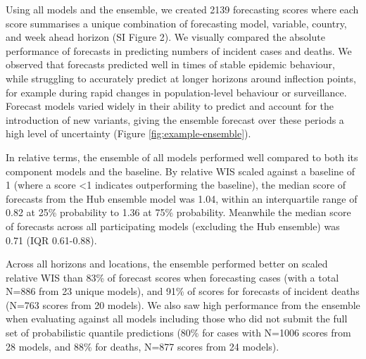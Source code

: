 \documentclass[
]{article}
\begin{document}
Using all models and the ensemble, we created 2139 forecasting scores where each score summarises a unique combination of forecasting model, variable, country, and week ahead horizon (SI Figure 2). We visually compared the absolute performance of forecasts in predicting numbers of incident cases and deaths. We observed that forecasts predicted well in times of stable epidemic behaviour, while struggling to accurately predict at longer horizons around inflection points, for example during rapid changes in population-level behaviour or surveillance. Forecast models varied widely in their ability to predict and account for the introduction of new variants, giving the ensemble forecast over these periods a high level of uncertainty (Figure \ref{fig:example-ensemble}).

In relative terms, the ensemble of all models performed well compared to both its component models and the baseline. By relative WIS scaled against a baseline of 1 (where a score \textless1 indicates outperforming the baseline), the median score of forecasts from the Hub ensemble model was 1.04, within an interquartile range of 0.82 at 25\% probability to 1.36 at 75\% probability. Meanwhile the median score of forecasts across all participating models (excluding the Hub ensemble) was 0.71 (IQR 0.61-0.88).

Across all horizons and locations, the ensemble performed better on scaled relative WIS than 83\% of forecast scores when forecasting cases (with a total N=886 from 23 unique models), and 91\% of scores for forecasts of incident deaths (N=763 scores from 20 models). We also saw high performance from the ensemble when evaluating against all models including those who did not submit the full set of probabilistic quantile predictions (80\% for cases with N=1006 scores from 28 models, and 88\% for deaths, N=877 scores from 24 models).
\end{document}
